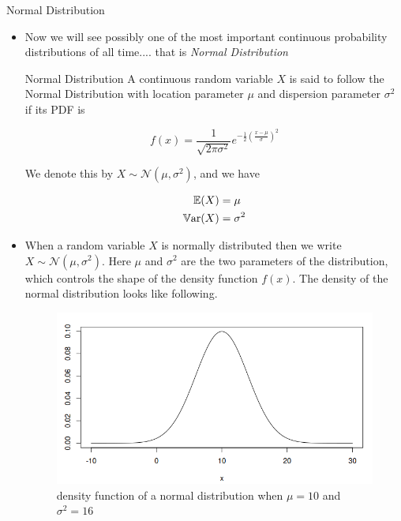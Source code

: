 \documentclass[8pt, usepdftitle = false]{beamer}
\begin{document}
\begin{frame}[allowframebreaks]{Normal Distribution}

\begin{itemize}

\item Now we will see possibly one of the most important continuous probability distributions of all time.... that is \emph{Normal Distribution}



\begin{varblock}{Normal Distribution}
A continuous random variable $X$ is said to follow the \alert{Normal Distribution} with location parameter $\mu$ and dispersion parameter $\sigma^2$ if its PDF is

$$
f(x)= \frac{1}{\sqrt{2 \pi \sigma^2}} e^{-\frac{1}{2}\left(\frac{x-\mu}{\sigma}\right)^2}
$$

We denote this by $X \sim \mathcal{N}(\mu, \sigma^2)$, and we have  

\begin{align*}
\mathbb{E}(X) &= \mu \\
\mathbb{V}\mathrm{ar}{(}X) &= \sigma^2
\end{align*}

	
\end{varblock}

\framebreak

\item   When a random variable $X$ is normally distributed then we write $X \sim \mathcal{N}(\mu, \sigma^2)$. Here $\mu$ and $\sigma^2$ are the \alert{two parameters} of the distribution, which controls the shape of the density function $f(x)$. The density of the normal distribution looks like following.


\begin{figure}
\centering
\includegraphics[scale = .4]{Images/pdfNormal_1.png}
\caption{density function of a normal distribution when $\mu = 10$ and $\sigma^2 = 16$}
\end{figure}


\end{itemize}
\end{frame}
\end{document}
